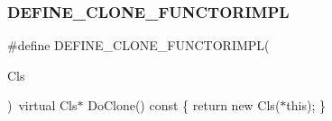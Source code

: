 \subsubsection{\texorpdfstring{DEFINE\_CLONE\_FUNCTORIMPL}{DEFINE\_CLONE\_FUNCTORIMPL}}
{\footnotesize\ttfamily \#define D\+E\+F\+I\+N\+E\+\_\+\+C\+L\+O\+N\+E\+\_\+\+F\+U\+N\+C\+T\+O\+R\+I\+M\+PL(\begin{DoxyParamCaption}\item[{}]{Cls }\end{DoxyParamCaption})~virtual Cls$\ast$ Do\+Clone() const \{ return new Cls($\ast$this); \}}

